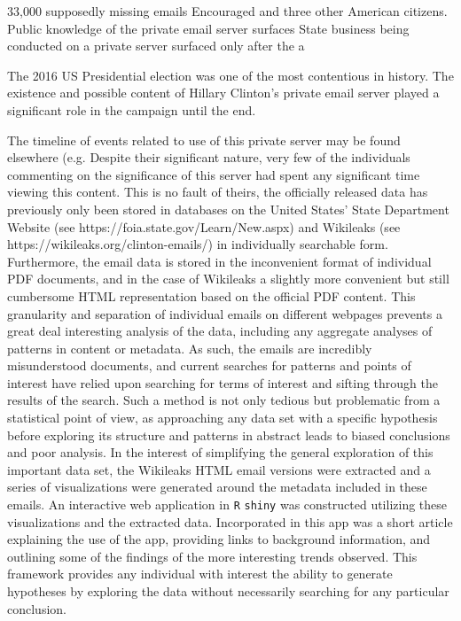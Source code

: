 \documentclass[journal]{vgtc}                %
\begin{document}
 
 33,000 supposedly missing emails
 Encouraged 
 and three other American citizens.  Public knowledge of the private email server surfaces State business being conducted on a private server surfaced only after the a

The 2016 US Presidential election was one of the most contentious in history.  The existence and possible content of Hillary Clinton's private email server played a significant role in the campaign until the end.  

The timeline of events related to use of this private server may be found elsewhere (e.g. 
Despite their significant nature, very few of the individuals commenting on the significance of this server had spent any significant time viewing this content. This is no fault of theirs, the officially released data has previously only been stored in databases on the United States' State Department Website (see https://foia.state.gov/Learn/New.aspx) and Wikileaks (see https://wikileaks.org/clinton-emails/) in individually searchable form. Furthermore, the email data is stored in the inconvenient format of individual PDF documents, and in the case of Wikileaks a slightly more convenient but still cumbersome HTML representation based on the official PDF content. This granularity and separation of individual emails on different webpages prevents a great deal interesting analysis of the data, including any aggregate analyses of patterns in content or metadata. As such, the emails are incredibly misunderstood documents, and current searches for patterns and points of interest have relied upon searching for terms of interest and sifting through the results of the search. Such a method is not only tedious but problematic from a statistical point of view, as approaching any data set with a specific hypothesis before exploring its structure and patterns in abstract leads to biased conclusions and poor analysis. In the interest of simplifying the general exploration of this important data set, the Wikileaks HTML email versions were extracted and a series of visualizations were generated around the metadata included in these emails. An interactive web application in \texttt{R} \texttt{shiny} was constructed utilizing these visualizations and the extracted data. Incorporated in this app was a short article explaining the use of the app, providing links to background information, and outlining some of the findings of the more interesting trends observed. This framework provides any individual with interest the ability to generate hypotheses by exploring the data without necessarily searching for any particular conclusion. 
\end{document}
